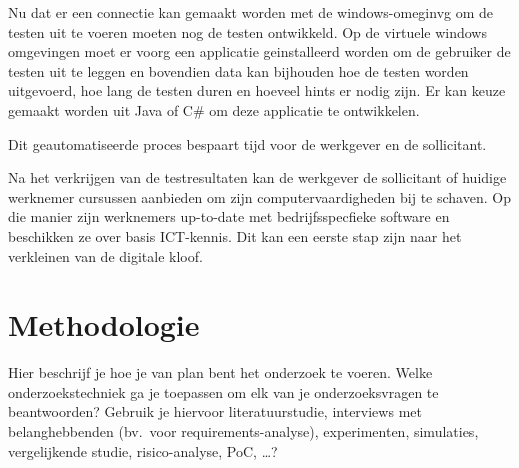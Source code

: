 Nu dat er een connectie kan gemaakt worden met de windows-omeginvg om de testen uit te voeren moeten nog de testen ontwikkeld. Op de virtuele windows omgevingen moet er voorg een applicatie geinstalleerd worden om de gebruiker de testen uit te leggen en bovendien data kan bijhouden hoe de testen worden uitgevoerd, hoe lang de testen duren en hoeveel hints er nodig zijn.  Er kan keuze gemaakt worden uit Java of C\# om deze applicatie te ontwikkelen.





Dit geautomatiseerde proces bespaart tijd voor de werkgever en de sollicitant.

Na het verkrijgen van de testresultaten kan de werkgever de sollicitant of huidige werknemer cursussen aanbieden om zijn computervaardigheden bij te schaven. Op die manier zijn werknemers up-to-date met bedrijfsspecfieke software en beschikken ze over basis ICT-kennis. Dit kan een eerste stap zijn naar het verkleinen van de digitale kloof.


\section{Methodologie}%
\label{sec:methodologie}

Hier beschrijf je hoe je van plan bent het onderzoek te voeren. Welke onderzoekstechniek ga je toepassen om elk van je onderzoeksvragen te beantwoorden? Gebruik je hiervoor literatuurstudie, interviews met belanghebbenden (bv.~voor requirements-analyse), experimenten, simulaties, vergelijkende studie, risico-analyse, PoC, \ldots?

